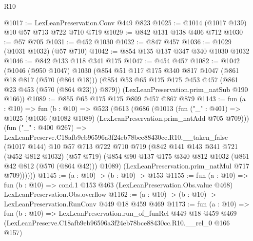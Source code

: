 \begin{lexlean}{R10}
\begin{coremodule}
@1017 := LexLeanPreservation.Conv @449 @823
@1025 := @1014 (@1017 @139) @10 @57 @713 @722 @710 @719
@1029 := @842 @131 @138 @406 @712
@1030 := @57 @705
@1031 := @452 @1030
@1032 := @847 @457
@1036 := @1029 (@1031 @1032) (@57 @710)
@1042 := @854 @135 @137 @347 @340 @1030 @1032
@1046 := @842 @133 @118 @341 @175
@1047 := @454 @457
@1082 := @1042
    (@1046
      (@950 @1047)
      @1030
      (@854
        @51
        @117
        @175
        @340
        @817
        @1047
        (@861 @18 @817 (@570 (@864 @18)))
        (@854 @53 @65 @175 @175 @453 @457 (@861 @23 @453 (@570 (@864 @23))) @879))
      (LexLeanPreservation.prim_natSub @190 @166))
@1089 := @855 @65 @175 @175 @809 @457 @867 @879
@1143 := fun (a : @10) =>
  fun (b : @10) =>
  @523
    (@613
      (@686
        (@1013
          (fun ("_" : @401) =>
          @1025 (@1036 (@1082 @1089) (LexLeanPreservation.prim_natAdd @705 @709)))
          (fun ("_" : @400 @267) =>
          LexLeanPreserve.C18afb9eb96596a3f24eb78bce88430cc.R10.__taken_false
            (@1017 @144)
            @10
            @57
            @713
            @722
            @710
            @719
            (@842
              @141
              @143
              @341
              @721
              (@452 @812 @1032)
              (@57 @719)
              (@854 @90 @137 @175 @340 @812 @1032 (@861 @42 @812 (@570 (@864 @42))) @1089)
              (LexLeanPreservation.prim_natMul @717 @709))))))
@1145 := (a : @10) -> (b : @10) -> @153
@1155 := fun (a : @10) =>
  fun (b : @10) =>
  cond.{1} @153 @463 (LexLeanPreservation.Obs.value @468) LexLeanPreservation.Obs.overflow
@1162 := (a : @10) -> (b : @10) -> LexLeanPreservation.RunConv @449 @18 @459 @469
@1173 := fun (a : @10) =>
  fun (b : @10) =>
  LexLeanPreservation.run_of_funRel
    @449
    @18
    @459
    @469
    (LexLeanPreserve.C18afb9eb96596a3f24eb78bce88430cc.R10.__rel_0 @166 @157)
\end{coremodule}
\end{lexlean}
